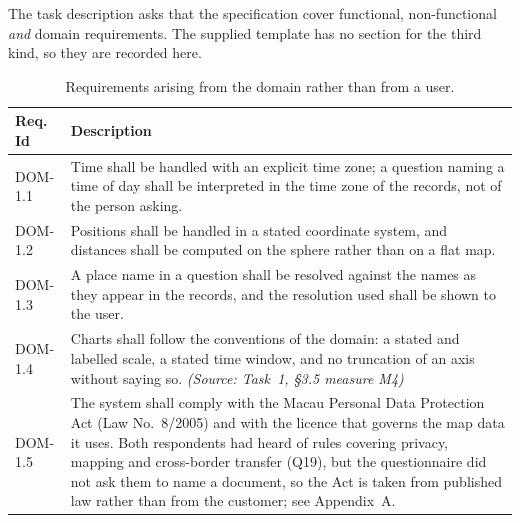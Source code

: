 \documentclass[12pt,a4paper]{report}
\def\chaptermark#1{\markboth{Chapter \thechapter\enspace #1}{}}
\newcommand{\src}[1]{{\small\itshape (Source: #1)}}
\begin{document}
The task description asks that the specification cover functional,
non-functional \emph{and} domain requirements. The supplied template has no
section for the third kind, so they are recorded here.

\begin{table}[H]
  \centering
  \caption{Requirements arising from the domain rather than from a user.}
  \label{tab:domain}
  \begin{tabular}{@{}l >{\raggedright\arraybackslash}p{13.0cm}@{}}
    \toprule[1.5pt]
    \textbf{Req. Id} & \textbf{Description} \\
    \midrule
    DOM-1.1 & Time shall be handled with an explicit time zone; a question
      naming a time of day shall be interpreted in the time zone of the
      records, not of the person asking. \\
    \addlinespace
    DOM-1.2 & Positions shall be handled in a stated coordinate system, and
      distances shall be computed on the sphere rather than on a flat map. \\
    \addlinespace
    DOM-1.3 & A place name in a question shall be resolved against the
      names as they appear in the records, and the resolution used shall be
      shown to the user. \\
    \addlinespace
    DOM-1.4 & Charts shall follow the conventions of the domain: a stated
      and labelled scale, a stated time window, and no truncation of an
      axis without saying so. \src{Task~1, \S3.5 measure M4} \\
    \addlinespace
    DOM-1.5 & The system shall comply with the Macau Personal Data
      Protection Act (Law No.~8/2005) and with the licence that governs the
      map data it uses. Both respondents had heard of rules covering privacy,
      mapping and cross-border transfer (Q19), but the questionnaire did not
      ask them to name a document, so the Act is taken from published law
      rather than from the customer; see Appendix~A. \\
    \bottomrule[1.5pt]
  \end{tabular}
\end{table}

\appendix
\def\chaptermark#1{\markboth{Appendix \thechapter\enspace #1}{}}
\end{document}
